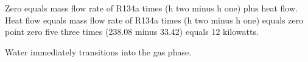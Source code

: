 Zero equals mass flow rate of R134a times (h two minus h one) plus heat flow.  
Heat flow equals mass flow rate of R134a times (h two minus h one) equals zero point zero five three times (238.08 minus 33.42) equals 12 kilowatts.  

Water immediately transitions into the gas phase.